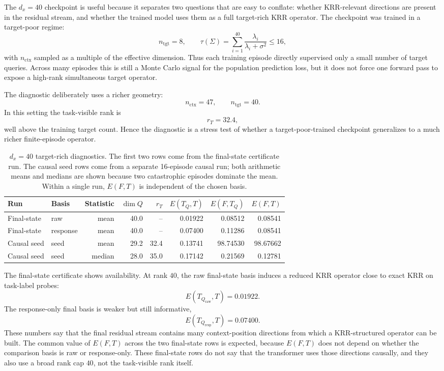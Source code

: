 \documentclass[11pt]{article}
\begin{document}
The \(d_x=40\) checkpoint is useful because it separates two questions that are easy to conflate:
whether KRR-relevant directions are present in the residual stream, and whether the trained model
uses them as a full target-rich KRR operator. The checkpoint was trained in a target-poor regime:
\[
n_{\mathrm{tgt}}=8,
\qquad
\tau(\Sigma)=\sum_{i=1}^{40}\frac{\lambda_i}{\lambda_i+\sigma^2}\le16,
\]
with \(n_{\mathrm{ctx}}\) sampled as a multiple of the effective dimension. Thus each training episode
directly supervised only a small number of target queries. Across many episodes this is still a
Monte Carlo signal for the population prediction loss, but it does not force one forward pass to
expose a high-rank simultaneous target operator.

The diagnostic deliberately uses a richer geometry:
\[
n_{\mathrm{ctx}}=47,\qquad n_{\mathrm{tgt}}=40.
\]
In this setting the task-visible rank is
\[
r_T=32.4,
\]
well above the training target count. Hence the diagnostic is a stress test of whether a
target-poor-trained checkpoint generalizes to a much richer finite-episode operator.

\begin{table}[htbp]
\centering
\caption{\(d_x=40\) target-rich diagnostics. The first two rows come from the final-state
certificate run. The causal seed rows come from a separate 16-episode causal run; both arithmetic
means and medians are shown because two catastrophic episodes dominate the mean. Within a single
run, \(E(F,T)\) is independent of the chosen basis.}
\scriptsize
\setlength{\tabcolsep}{2.4pt}
\renewcommand{\arraystretch}{0.9}
\begin{tabular}{llrrrrrr}
\toprule
Run & Basis & Statistic & \(\dim Q\) & \(r_T\) & \(E(T_Q,T)\) & \(E(F,T_Q)\) & \(E(F,T)\)\\
\midrule
Final-state & raw & mean & 40.0 & -- & 0.01922 & 0.08512 & 0.08541\\
Final-state & response & mean & 40.0 & -- & 0.07400 & 0.11286 & 0.08541\\
Causal seed & seed & mean & 29.2 & 32.4 & 0.13741 & 98.74530 & 98.67662\\
Causal seed & seed & median & 28.0 & 35.0 & 0.17142 & 0.21569 & 0.12781\\
\bottomrule
\end{tabular}
\renewcommand{\arraystretch}{1}
\end{table}

The final-state certificate shows availability. At rank \(40\), the raw final-state basis induces a
reduced KRR operator close to exact KRR on task-label probes:
\[
E(T_{Q_{\mathrm{raw}}},T)=0.01922.
\]
The response-only final basis is weaker but still informative,
\[
E(T_{Q_{\mathrm{resp}}},T)=0.07400.
\]
These numbers say that the final residual stream contains many context-position directions from
which a KRR-structured operator can be built. The common value of \(E(F,T)\) across the two
final-state rows is expected, because \(E(F,T)\) does not depend on whether the comparison basis is
raw or response-only. These final-state rows do not say that the transformer uses those directions
causally, and they also use a broad rank cap \(40\), not the task-visible rank itself.
\end{document}
